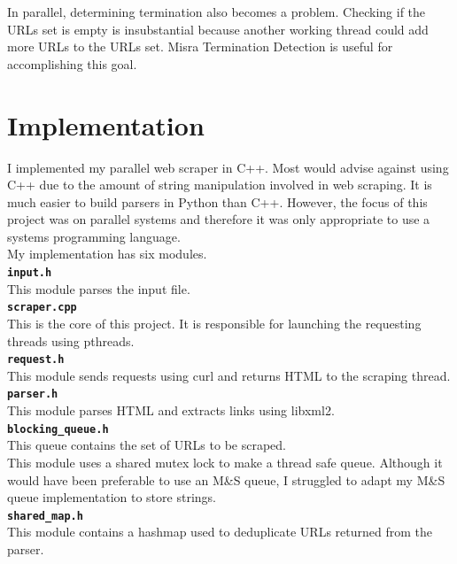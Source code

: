\documentclass[11pt]{article}
\begin{document}
In parallel, determining termination also becomes a problem. Checking if the URLs set is empty is insubstantial because another working thread could add more URLs to the URLs set. Misra Termination Detection is useful for accomplishing this goal.

\section{Implementation}

I implemented my parallel web scraper in C++. Most would advise against using C++ due to the amount of string manipulation involved in web scraping. It is much easier to build parsers in Python than C++. However, the focus of this project was on parallel systems and therefore it was only appropriate to use a systems programming language. \\

My implementation has six modules. \\

\textbf{\texttt{input.h}} \\
This module parses the input file.\\

\textbf{\texttt{scraper.cpp}} \\
This is the core of this project. It is responsible for launching the requesting threads using pthreads.\\

\textbf{\texttt{request.h}} \\
This module sends requests using curl and returns HTML to the scraping thread.\\

\textbf{\texttt{parser.h}} \\
This module parses HTML and extracts links using libxml2.\\

\textbf{\texttt{blocking\_queue.h}} \\
This queue contains the set of URLs to be scraped. \\

This module uses a shared mutex lock to make a thread safe queue. Although it would have been preferable to use an M\&S queue, I struggled to adapt my M\&S queue implementation to store strings.\\ 

\textbf{\texttt{shared\_map.h}} \\
This module contains a hashmap used to deduplicate URLs returned from the parser. \\
\end{document}
